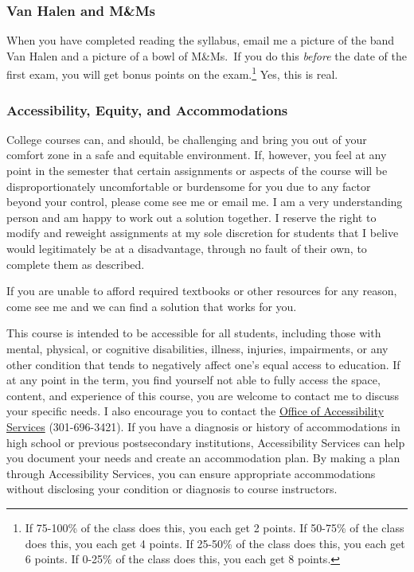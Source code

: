 \documentclass{article}
\begin{document}
\hypertarget{van-halen-and-mms}{%
\subsubsection*{Van Halen and M\&Ms}\label{van-halen-and-mms}}

When you have completed reading the syllabus, email me a picture of the
band Van Halen and a picture of a bowl of M\&Ms.~If you do this
\emph{before} the date of the first exam, you will get bonus points on
the exam.\footnote{If 75-100\% of the class does this, you each get 2
  points. If 50-75\% of the class does this, you each get 4 points. If
  25-50\% of the class does this, you each get 6 points. If 0-25\% of
  the class does this, you each get 8 points.} Yes, this is real.

\hypertarget{accessibility-equity-and-accommodations}{%
\subsubsection*{Accessibility, Equity, and
Accommodations}\label{accessibility-equity-and-accommodations}}

College courses can, and should, be challenging and bring you out of
your comfort zone in a safe and equitable environment. If, however, you
feel at any point in the semester that certain assignments or aspects of
the course will be disproportionately uncomfortable or burdensome for
you due to any factor beyond your control, please come see me or email
me. I am a very understanding person and am happy to work out a solution
together. I reserve the right to modify and reweight assignments at my
sole discretion for students that I belive would legitimately be at a
disadvantage, through no fault of their own, to complete them as
described.

If you are unable to afford required textbooks or other resources for
any reason, come see me and we can find a solution that works for you.

This course is intended to be accessible for all students, including
those with mental, physical, or cognitive disabilities, illness,
injuries, impairments, or any other condition that tends to negatively
affect one's equal access to education. If at any point in the term, you
find yourself not able to fully access the space, content, and
experience of this course, you are welcome to contact me to discuss your
specific needs. I also encourage you to contact the
\href{https://www.hood.edu/academics/josephine-steiner-center-academic-achievement-retention/accessibility-services}{Office
of Accessibility Services} (301-696-3421). If you have a diagnosis or
history of accommodations in high school or previous postsecondary
institutions, Accessibility Services can help you document your needs
and create an accommodation plan. By making a plan through Accessibility
Services, you can ensure appropriate accommodations without disclosing
your condition or diagnosis to course instructors.
\end{document}

